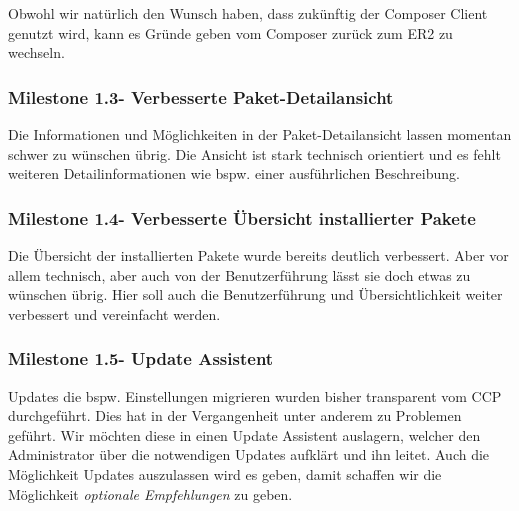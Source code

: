 \documentclass[
paper=a4,
draft=false,%
fontsize=10pt%
]{scrartcl}
\begin{document}
Obwohl wir natürlich den Wunsch haben, dass zukünftig der Composer Client genutzt wird, kann es Gründe geben vom Composer zurück zum ER2 zu wechseln.

\subsubsection[Milestone 1.3 - Verbesserte Paket-Detailansicht]{Milestone 1.3\footnotemark - Verbesserte Paket-Detailansicht}
\label{subsec:ccc-milestone-1.3}

Die Informationen und Möglichkeiten in der Paket-Detailansicht lassen momentan schwer zu wünschen übrig. Die Ansicht ist stark technisch orientiert und es fehlt weiteren Detailinformationen wie bspw. einer ausführlichen Beschreibung.

\subsubsection[Milestone 1.4 - Verbesserte Übersicht installierter Pakete]{Milestone 1.4\footnotemark - Verbesserte Übersicht installierter Pakete}
\label{subsec:ccc-milestone-1.4}

Die Übersicht der installierten Pakete wurde bereits deutlich verbessert. Aber vor allem technisch, aber auch von der Benutzerführung lässt sie doch etwas zu wünschen übrig. Hier soll auch die Benutzerführung und Übersichtlichkeit weiter verbessert und vereinfacht werden.

\subsubsection[Milestone 1.5 - Update Assistent]{Milestone 1.5\footnotemark - Update Assistent}
\label{subsec:ccc-milestone-1.5}

Updates die bspw. Einstellungen migrieren wurden bisher transparent vom CCP durchgeführt. Dies hat in der Vergangenheit unter anderem zu Problemen geführt. Wir möchten diese in einen Update Assistent auslagern, welcher den Administrator über die notwendigen Updates aufklärt und ihn leitet. Auch die Möglichkeit Updates auszulassen wird es geben, damit schaffen wir die Möglichkeit \textit{optionale Empfehlungen} zu geben.
\end{document}

